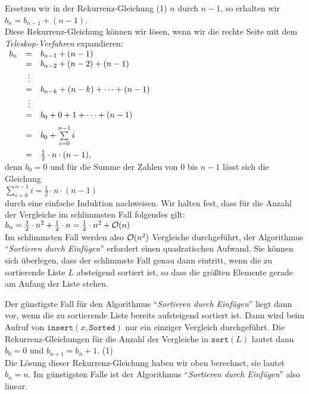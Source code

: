 Ersetzen wir in der Rekurrenz-Gleichung (1) $n$ durch $n-1$, so erhalten wir 
\\[0.2cm]
\hspace*{1.3cm}
$b_n = b_{n-1} + (n - 1)$.
\\[0.2cm]
Diese Rekurrenz-Gleichung k\"onnen wir l\"osen, wenn wir die rechte Seite mit dem
\emph{Teleskop-Verfahren} expandieren:
\\[0.2cm]
\hspace*{1.3cm}
$
\begin{array}[t]{lcl}
  b_{n} & = & b_{n-1} + (n - 1)                     \\ 
        & = & b_{n-2} + (n - 2) + (n - 1)           \\ 
        & \vdots &                                  \\
        & = & b_{n-k} + (n - k) + \cdots + (n - 1)  \\ 
        & \vdots &                                  \\
        & = & b_{0} + 0 + 1 + \cdots + (n - 1)      \\[0.2cm] 
        & = & b_{0} + \sum\limits_{i = 0}^{n - 1} i \\[0.4cm]
        & = & \frac{1}{2} \cdot n \cdot (n - 1),
\end{array}
$
\\[0.2cm]
denn $b_0 = 0$ und f\"ur die Summe der Zahlen von 0 bis $n - 1$ l\"asst sich die Gleichung
\\[0.2cm]
\hspace*{1.3cm}
$\sum\limits_{i = 0}^{n - 1} i  = \frac{1}{2} \cdot n \cdot (n - 1)$
\\[0.2cm]
durch eine einfache Induktion nachweisen.  Wir halten fest, dass f\"ur die Anzahl der
Vergleiche im schlimmsten Fall folgendes gilt:
\\[0.2cm]
\hspace*{1.3cm}
$b_n = \frac{1}{2} \cdot n^2 + \frac{1}{2} \cdot n = \frac{1}{2} \cdot n^2 + \mathcal{O}(n)$
\\[0.2cm]
Im schlimmsten Fall werden also $\mathcal{O}(n^2)$ Vergleiche durchgef\"uhrt, der Algorithmus 
``\emph{Sortieren durch Einf\"ugen}'' erfordert einen quadratischen Aufwand.
Sie k\"onnen sich \"uberlegen, dass der schlimmste Fall genau dann eintritt, wenn die zu
sortierende Liste $L$ absteigend sortiert ist, so dass die gr\"o{\ss}ten Elemente gerade am
Anfang der Liste stehen.

Der g\"unstigste Fall f\"ur den Algorithmus ``\emph{Sortieren durch Einf\"ugen}'' liegt dann
vor, wenn die zu sortierende Liste bereits aufsteigend sortiert ist.  Dann wird beim
Aufruf von $\mathtt{insert}(x,\mathtt{Sorted})$ nur ein einziger Vergleich durchgef\"uhrt.
Die Rekurrenz-Gleichungen f\"ur die Anzahl der Vergleiche in $\mathtt{sort}(L)$ lautet dann \\[0.2cm]
\hspace*{1.3cm} $b_0 = 0$ \quad und \quad $b_{n+1} = b_n + 1$. \hspace*{\fill} (1)\\[0.2cm]
Die L\"osung dieser Rekurrenz-Gleichung haben wir oben berechnet, sie lautet $b_n = n$.
Im g\"unstigsten Falle ist der Algorithmus ``\emph{Sortieren durch Einf\"ugen}'' also linear.

